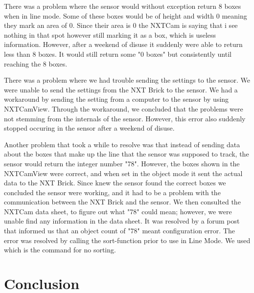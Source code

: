 There was a problem where the sensor would without exception return 8 boxes when in line mode. Some of these boxes would be of height and width 0 meaning they mark an area of 0. Since their area is 0 the NXTCam is saying that i see nothing in that spot however still marking it as a box, which is useless information. However, after a weekend of disuse it suddenly were able to return less than 8 boxes. It would still return some "0 boxes" but consistently until reaching the 8 boxes. 

There was a problem where we had trouble sending the settings to the sensor. We were unable to send the settings from the NXT Brick to the sensor. We had a workaround by sending the setting from a computer to the sensor by using NXTCamView. Through the workaround, we concluded that the problems were not stemming from the internals of the sensor. However, this error also suddenly stopped occuring in the sensor after a weekend of disuse.


Another problem that took a while to resolve was that instead of sending data about the boxes that make up the line that the sensor was supposed to track, the sensor would return the integer number "78". However, the boxes shown in the NXTCamView were correct, and when set in the object mode it sent the actual data to the NXT Brick. Since knew the sensor found the correct boxes we concluded the sensor were working, and it had to be a problem with the communication between the NXT Brick and the sensor. We then consulted the NXTCam data sheet, to figure out what "78" could mean; however, we were unable find any information in the data sheet. It was resolved by a forum post that informed us that an object count of "78" meant configuration error. The error was resolved by calling the sort-function prior to use in Line Mode. We used  which is the command for no sorting. 




\section{Conclusion}

